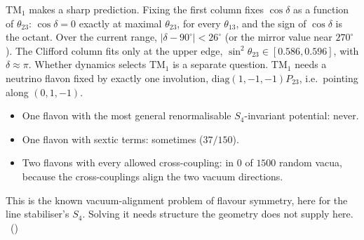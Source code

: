 TM$_1$ makes a sharp prediction. Fixing the first column fixes $\cos\delta$ as a function of $\theta_{23}$:
$\cos\delta=0$ exactly at maximal $\theta_{23}$, for every $\theta_{13}$, and the sign of $\cos\delta$ is the octant.
Over the current range, $|\delta-90^\circ|<26^\circ$ (or the mirror value near $270^\circ$). The Clifford column
fits only at the upper edge, $\sin^2\theta_{23}\in[0.586,0.596]$, with $\delta\approx\pi$. Whether dynamics selects
TM$_1$ is a separate question. TM$_1$ needs a neutrino flavon fixed by exactly one involution,
$\mathrm{diag}(1,-1,-1)P_{23}$, i.e.\ pointing along $(0,1,-1)$.
\begin{itemize}
\item One flavon with the most general renormalisable $S_4$-invariant potential: never.
\item One flavon with sextic terms: sometimes ($37/150$).
\item Two flavons with every allowed cross-coupling: in $0$ of $1500$ random vacua, because the cross-couplings align
  the two vacuum directions.
\end{itemize}
This is the known vacuum-alignment problem of flavour symmetry, here for the line stabiliser's $S_4$. Solving it needs
structure the geometry does not supply here. \tierC\ ()

